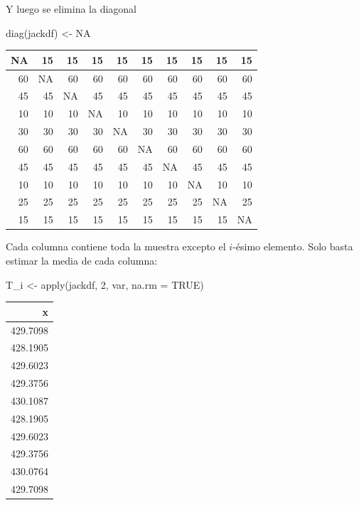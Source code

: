\documentclass[
  12pt,
]{book}
\newenvironment{Shaded}{\begin{snugshade}}{\end{snugshade}}
\newcommand{\AttributeTok}[1]{\textcolor[rgb]{0.77,0.63,0.00}{#1}}
\newcommand{\ConstantTok}[1]{\textcolor[rgb]{0.00,0.00,0.00}{#1}}
\newcommand{\DecValTok}[1]{\textcolor[rgb]{0.00,0.00,0.81}{#1}}
\newcommand{\FunctionTok}[1]{\textcolor[rgb]{0.00,0.00,0.00}{#1}}
\newcommand{\NormalTok}[1]{#1}
\newcommand{\OtherTok}[1]{\textcolor[rgb]{0.56,0.35,0.01}{#1}}
\theoremstyle{definition}
\theoremstyle{definition}
\theoremstyle{definition}
\theoremstyle{remark}
\begin{document}
Y luego se elimina la diagonal

\begin{Shaded}
\begin{Highlighting}[]
\FunctionTok{diag}\NormalTok{(jackdf) }\OtherTok{\textless{}{-}} \ConstantTok{NA}
\end{Highlighting}
\end{Shaded}

\begin{tabular}{r|r|r|r|r|r|r|r|r|r}
\hline
NA & 15 & 15 & 15 & 15 & 15 & 15 & 15 & 15 & 15\\
\hline
60 & NA & 60 & 60 & 60 & 60 & 60 & 60 & 60 & 60\\
\hline
45 & 45 & NA & 45 & 45 & 45 & 45 & 45 & 45 & 45\\
\hline
10 & 10 & 10 & NA & 10 & 10 & 10 & 10 & 10 & 10\\
\hline
30 & 30 & 30 & 30 & NA & 30 & 30 & 30 & 30 & 30\\
\hline
60 & 60 & 60 & 60 & 60 & NA & 60 & 60 & 60 & 60\\
\hline
45 & 45 & 45 & 45 & 45 & 45 & NA & 45 & 45 & 45\\
\hline
10 & 10 & 10 & 10 & 10 & 10 & 10 & NA & 10 & 10\\
\hline
25 & 25 & 25 & 25 & 25 & 25 & 25 & 25 & NA & 25\\
\hline
15 & 15 & 15 & 15 & 15 & 15 & 15 & 15 & 15 & NA\\
\hline
\end{tabular}

Cada columna contiene toda la muestra excepto el \(i\)-ésimo
elemento. Solo basta estimar la media de cada columna:

\begin{Shaded}
\begin{Highlighting}[]
\NormalTok{T\_i }\OtherTok{\textless{}{-}} \FunctionTok{apply}\NormalTok{(jackdf, }\DecValTok{2}\NormalTok{, var, }\AttributeTok{na.rm =} \ConstantTok{TRUE}\NormalTok{)}
\end{Highlighting}
\end{Shaded}

\begin{tabular}{r}
\hline
x\\
\hline
429.7098\\
\hline
428.1905\\
\hline
429.6023\\
\hline
429.3756\\
\hline
430.1087\\
\hline
428.1905\\
\hline
429.6023\\
\hline
429.3756\\
\hline
430.0764\\
\hline
429.7098\\
\hline
\end{tabular}
\end{document}
